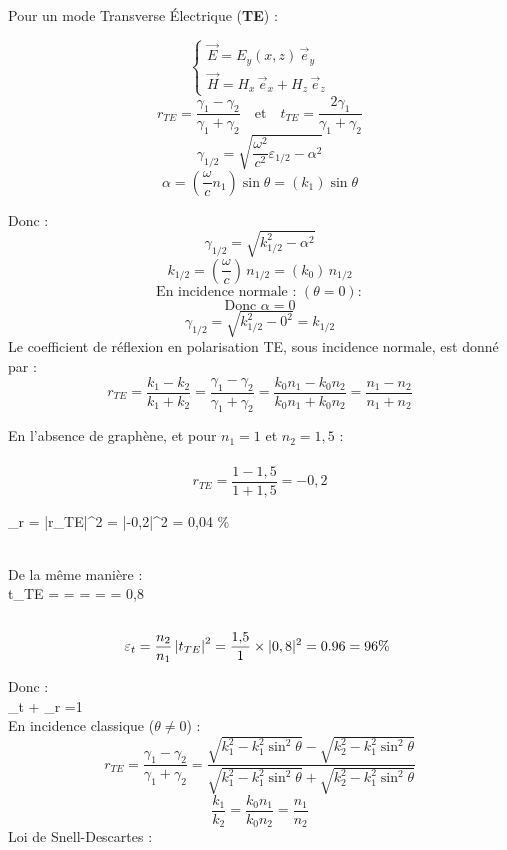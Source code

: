 \documentclass{article}
\begin{document}
Pour un mode Transverse Électrique (\textbf{TE}) :

\[

\begin{cases}
\vec{E} = E_y(x,z) \, \vec{e}_y \\
\vec{H} = H_x \, \vec{e}_x + H_z \, \vec{e}_z
\end{cases}
\]
\[
r_{TE} = \frac{\gamma_1 - \gamma_2}{\gamma_1 + \gamma_2}
\quad \text{et} \quad
t_{TE} = \frac{2\gamma_1}{\gamma_1 + \gamma_2}
\]
\[
\gamma_{1/2} = \sqrt{\frac{\omega^2}{c^2} \varepsilon_{1/2} - \alpha^2}
\]
\[
\alpha = \left( \frac{\omega}{c} n_1 \right) \sin \theta = (k_1)\sin \theta
\]

Donc : 
\[
\gamma_{1/2} = \sqrt{k_{1/2}^2 - \alpha^2}
\]
\[
k_{1/2} = \left( \frac{\omega}{c} \right) \, n_{1/2} = (k_0) \, n_{1/2}
\]
\[
\text{En incidence normale : } (\theta = 0) :
\]
\[
\text{Donc } \alpha = 0
\]
\[
\gamma_{1/2} = \sqrt{k_{1/2}^2 - 0^2} = k_{1/2}
\]
Le coefficient de réflexion en polarisation TE, sous incidence normale, est donné par :
\[
r_{TE} = \frac{k_1 - k_2}{k_1 + k_2}= 
\frac{\gamma_1 - \gamma_2}{\gamma_1 + \gamma_2}
= \frac{k_0 n_1 - k_0 n_2}{k_0 n_1 + k_0 n_2}
= \frac{n_1 - n_2}{n_1 + n_2}
\]

En l'absence de graphène, et pour \( n_1 = 1 \) et \( n_2 = 1{,}5 \) : \\ \\
\[
r_{TE} = \frac{1 - 1{,}5}{1 + 1{,}5}=-0,2
\]

\varepsilon_r =  |r_{TE}|^2 
= |{-0{,}2}|^2 = 0{,}04 \% \\\

De la même manière : \\

t_{TE} = 
= 
= 
= 
= 0{,}8 \\\\
\[
\varepsilon_t = \frac{n_2}{n_1} \left| t_{TE} \right|^2=\frac{1{,}5}{1} \times |0{,8}|^2=0.96=96\% \\\
\]

Donc : \\

\varepsilon_t + \varepsilon_r =1 \\

En incidence classique (\( \theta \ne 0 \)) :
\[
r_{TE} = \frac{\gamma_1 - \gamma_2}{\gamma_1 + \gamma_2}
= \frac{
\sqrt{k_1^2 - k_1^2 \sin^2 \theta}
-
\sqrt{k_2^2 - k_1^2 \sin^2 \theta}
}{
\sqrt{k_1^2 - k_1^2 \sin^2 \theta}
+
\sqrt{k_2^2 - k_1^2 \sin^2 \theta}
}
\]
\[
\frac{k_1}{k_2} = \frac{k_0 n_1}{k_0 n_2} = \frac{n_1}{n_2}
\]
Loi de Snell-Descartes : 
\end{document}
